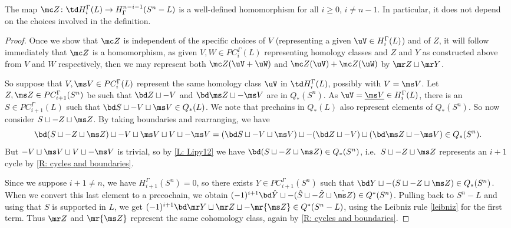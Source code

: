\begin{example}
\begin{proposition}
	The map $\mc Z \colon \td H_i^\Gamma(L) \to H^{n-i-1}_\Gamma(S^n-L)$ is a well-defined homomorphism for all $i \geq 0$, $i \neq n-1$.
	In particular, it does not depend on the choices involved in the definition.
\end{proposition}
\begin{proof}
	Once we show that $\mc Z$ is independent of the specific choices of $V$ (representing a given $\uV \in H_i^\Gamma(L)$) and of $Z$, it will follow immediately that $\mc Z$ is a homomorphism, as given $V,W\in PC_i^\Gamma(L)$ representing homology classes and $Z$ and $Y$ as constructed above from $V$ and $W$ respectively, then we may represent both $\mc Z(\uV + \uW)$ and $\mc Z(\uV) + \mc Z(\uW)$ by $\mr Z \sqcup \mr Y$.

	So suppose that $V,\ms V \in PC_i^\Gamma(L)$ represent the same homology class $\uV$ in $\td H_i^\Gamma(L)$, possibly with $V = \ms V$.
	Let $Z,\ms Z \in PC_{i+1}^\Gamma(S^n)$ be such that $\bd Z \sqcup -V$ and $\bd \ms Z \sqcup -\ms V$ are in $Q_*(S^n)$.
	As $\uV=\underline{\ms V} \in H_i^\Gamma(L)$, there is an $S \in PC_{i+1}^\Gamma(L)$ such that $\bd S \sqcup -V \sqcup \ms V \in Q_*(L)$.
	We note that prechains in $Q_*(L)$ also represent elements of $Q_*(S^n)$.
	So now consider $S \sqcup -Z \sqcup \ms Z$.
	By taking boundaries and rearranging, we have $$\bd (S \sqcup -Z \sqcup \ms Z)\sqcup -V \sqcup \ms V \sqcup V \sqcup -\ms V = (\bd S \sqcup -V \sqcup \ms V)\sqcup -(\bd Z \sqcup -V) \sqcup (\bd \ms Z\sqcup -\ms V)\in Q_*(S^n).$$
	But  $-V \sqcup \ms V \sqcup V \sqcup -\ms V$ is trivial, so by \cref{L: Lipy12} we have $\bd(S \sqcup -Z \sqcup \ms Z)\in Q_*(S^n)$, i.e.\ $S \sqcup -Z \sqcup \ms Z$ represents an $i+1$ cycle by \cref{R: cycles and boundaries}.

	Since we suppose $i+1\neq n$, we have $H_{i+1}^\Gamma(S^n) = 0$, so there exists $Y \in PC_{i+1}^\Gamma(S^n)$ such that $\bd Y \sqcup -(S \sqcup -Z \sqcup \ms Z) \in Q_*(S^n)$.
	When we convert this last element to a precochain, we obtain  $(-1)^{i+1}\bd \hat Y \sqcup -(\hat S \sqcup -\hat Z \sqcup \hat{\ms Z}) \in Q^*(S^n)$.
	Pulling back to $S^n - L$ and using that $S$ is supported in $L$, we get
	$(-1)^{i+1}\bd \mr Y \sqcup \mr Z \sqcup -\mr {\ms Z} \in Q^*(S^n - L)$, using the Leibniz rule \cref{leibniz} for the first term.
	Thus $\mr Z$ and $\mr {\ms Z}$ represent the same cohomology class, again by \cref{R: cycles and boundaries}.
\end{proof}


\end{example}
